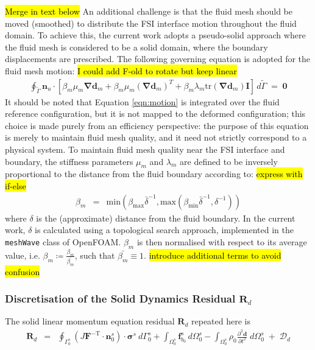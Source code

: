 \documentclass[sn-mathphys,Numbered]{sn-jnl}%
\newcommand{\bb}{\boldsymbol}
\begin{document}
\hl{Merge in text below}
An additional challenge is that the fluid mesh should be moved (smoothed) to distribute the FSI interface motion throughout the fluid domain.
To achieve this, the current work adopts a pseudo-solid approach where the fluid mesh is considered to be a solid domain, where the boundary displacements are prescribed.
The following governing equation is adopted for the fluid mesh motion: \hl{I could add F-old to rotate but keep linear}
\begin{eqnarray} \label{eqn:motion}
    \oint_{\tilde{\Gamma}}
    \bb{n}_u \cdot \left[ \beta_m \mu_m \bb{\nabla}\bb{d}_m
    + \beta_m \mu_m (\bb{\nabla}\bb{d}_m)^T
    + \beta_m \lambda_m \text{tr}(\bb{\nabla} \bb{d}_m)\textbf{I} \right] 
    \, d\tilde{\Gamma}
    \;=\; \bb{0}
\end{eqnarray}
It should be noted that Equation \ref{eqn:motion} is integrated over the fluid reference configuration, but it is not mapped to the deformed configuration; this choice is made purely from an efficiency perspective: the purpose of this equation is merely to maintain fluid mesh quality, and it need not strictly correspond to a physical system.
To maintain fluid mesh quality near the FSI interface and boundary, the stiffness parameters $\mu_m$ and $\lambda_m$ are defined to be inversely proportional to the distance from the fluid boundary according to:
\hl{express with if-else}
\begin{eqnarray}
	\beta_m &=& \text{min}(\beta_\text{max} \bar{\delta}^{-1}, \text{max}(\beta_\text{min} \bar{\delta}^{-1}, \delta^{-1}))
\end{eqnarray}
where $\delta$ is the (approximate) distance from the fluid boundary.
In the current work, $\delta$ is calculated using a topological search approach, implemented in the \texttt{meshWave} class of OpenFOAM.
$\beta_m$ is then normalised with respect to its average value, i.e. $\beta_m \coloneqq \frac{\beta_m}{\bar{\beta_m}}$, such that $\bar{\beta_m} \equiv 1$. \hl{introduce additional terms to avoid confusion}




\subsubsection[Discretisation of the Solid Dynamics Residual]{Discretisation of the Solid Dynamics Residual $\bb{R}_d$}
The solid linear momentum equation residual $\bb{R}_d$ repeated here is
\begin{eqnarray}
    \bb{R}_d
    &=&
    \oint_{\Gamma_0^s} \left( J \bb{F}^{-\text{T}} \cdot \bb{n}_0^s \right) \cdot \bb{\sigma}^s \ d\Gamma_0^s
    + \int_{\Omega_0^s}  \bb{f}_{b_0}^s \, d\Omega_0^s
    - \int_{\Omega_0^s} \rho_0 \frac{\partial^2 \bb{d} }{\partial t^2} \; d\Omega_0^s
    \;+\; \bb{\mathcal{D}}_d
\end{eqnarray}
\end{document}
